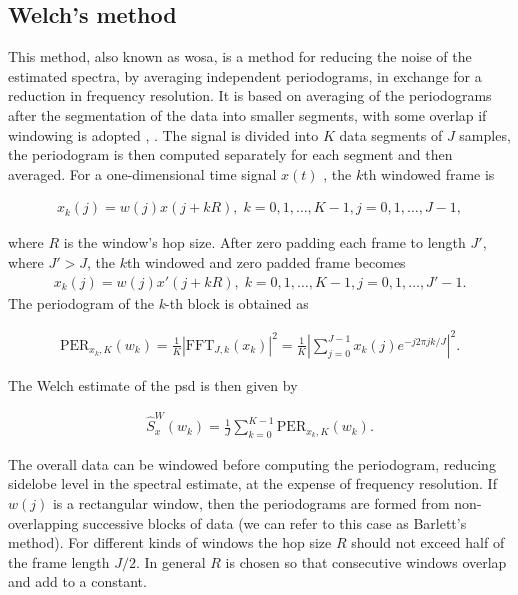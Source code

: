 	
	\subsection{Welch's method}
	
	This method, also known as \gls{wosa}, is a method for reducing the noise of the estimated spectra, by averaging independent periodograms, in exchange for a reduction in frequency resolution.
	It is based on averaging of the periodograms after the segmentation of the data into smaller segments, with some overlap if windowing is adopted \cite{Welch_period}, \cite{Spagnolini_ch14}.
	The signal is divided into $K$ data segments of $J$ samples, the periodogram is then computed separately for each segment and then averaged.
	For a one-dimensional time signal $x(t)$ \cite{SASPWEB2011}, the $k$th windowed frame is
	
	\begin{align}
		x_k(j) = w(j)x(j + kR), \; k=0,1,\ldots, K-1, j=0,1,\ldots, J-1,
	\end{align}
	
	where $R$ is the window's hop size.
	After zero padding each frame to length $J'$, where $J' > J$, the $k$th windowed and zero padded frame becomes
		\begin{align}
		x_k(j) = w(j)x'(j + kR), \; k=0,1,\ldots, K-1, j=0,1,\ldots, J'-1.
	\end{align}
	The periodogram of the \textit{k}-th block is obtained as
	
	\begin{align}
		\text{PER}_{x_k,K}(w_k) = \frac{1}{K} |\text{FFT}_{J,k}(x_k)|^2 = \frac{1}{K}\left|\sum_{j=0}^{J-1}x_k(j)e^{-j2\pi jk/J}\right|^2.
	\end{align}
	
	The Welch estimate of the \gls{psd} is then given by
	
	\begin{align}
		\hat{S}^W_x(w_k) = \frac{1}{J}\sum_{k=0}^{K-1}\text{PER}_{x_k,K}(w_k).
	\end{align}
	
	The overall data can be windowed before computing the periodogram, reducing sidelobe level in the spectral estimate, at the expense of frequency resolution. If $w(j)$ is a rectangular window, then the periodograms are formed from non-overlapping successive blocks of data (we can refer to this case as Barlett's method). For different kinds of windows the hop size $R$ should not exceed half of the frame length $J/2$. In general $R$ is chosen so that consecutive windows overlap and add to a constant.
	
	
	

	

    
    
    